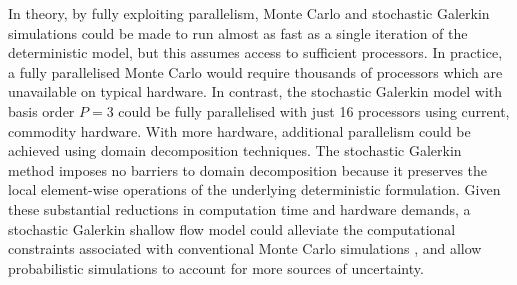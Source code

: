 In theory, by fully exploiting parallelism, Monte Carlo and stochastic Galerkin simulations could be made to run almost as fast as a single iteration of the deterministic model, but this assumes access to sufficient processors.
In practice, a fully parallelised Monte Carlo would require thousands of processors which are unavailable on typical hardware.
In contrast, the stochastic Galerkin model with basis order $P=3$ could be fully parallelised with just 16 processors using current, commodity hardware.
With more hardware, additional parallelism could be achieved using domain decomposition techniques.
The stochastic Galerkin method imposes no barriers to domain decomposition because it preserves the local element-wise operations of the underlying deterministic formulation.
Given these substantial reductions in computation time and hardware demands, a stochastic Galerkin shallow flow model could alleviate the computational constraints associated with conventional Monte Carlo simulations \citep{neal2013}, and allow probabilistic simulations to account for more sources of uncertainty.